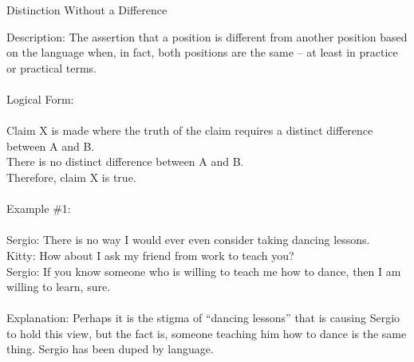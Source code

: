 \documentclass[a4paper,12pt,single,pdftex]{scrbook}
\begin{document}
  

Distinction Without a Difference
    
      Description: The assertion that a position is different from another position based on the language when, in fact, both positions are the same -- at least in practice or practical terms.
    \\

    
      
    \\

    
      Logical Form:
    \\

    
      
    \\

    
      Claim X is made where the truth of the claim requires a distinct difference between A and B.
    \\

    
      There is no distinct difference between A and B.
    \\

    
      Therefore, claim X is true.
    \\

    
      
    \\

    
      Example \#1:
    \\

    
      
    \\

    
      Sergio: There is no way I would ever even consider taking dancing lessons.
    \\

    
      Kitty: How about I ask my friend from work to teach you?
    \\

    
      Sergio: If you know someone who is willing to teach me how to dance, then I am willing to learn, sure.
    \\

    
      
    \\

    
      Explanation: Perhaps it is the stigma of “dancing lessons” that is causing Sergio to hold this view, but the fact is, someone teaching him how to dance is the same thing.  Sergio has been duped by language.
    \\
\end{document}
